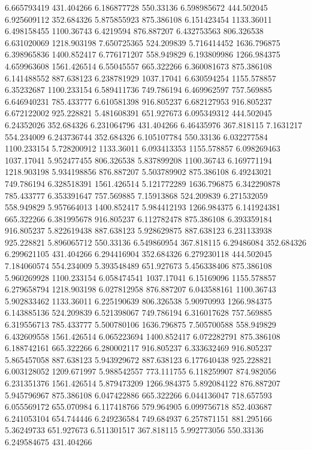6.665793419	431.404266
6.186877728	550.33136
6.598985672	444.502045
6.925609112	352.684326
5.875855923	875.386108
6.151423454	1133.36011
6.498158455	1100.36743
6.4219594	876.887207
6.432753563	806.326538
6.631020069	1218.903198
7.650725365	524.209839
5.716414452	1636.796875
6.398965836	1400.852417
6.776171207	558.949829
6.193809986	1266.984375
4.659963608	1561.426514
6.55045557	665.322266
6.360081673	875.386108
6.141488552	887.638123
6.238781929	1037.17041
6.630594254	1155.578857
6.35232687	1100.233154
6.589411736	749.786194
6.469962597	757.569885
6.646940231	785.433777
6.610581398	916.805237
6.682127953	916.805237
6.672122002	925.228821
5.481608391	651.927673
6.095349312	444.502045
6.24352026	352.684326
6.231064796	431.404266
6.46435976	367.818115
7.1631217	554.234009
6.243736744	352.684326
6.105107784	550.33136
6.032277584	1100.233154
5.728200912	1133.36011
6.093413353	1155.578857
6.098269463	1037.17041
5.952477455	806.326538
5.837899208	1100.36743
6.169771194	1218.903198
5.934198856	876.887207
5.503789902	875.386108
6.49243021	749.786194
6.328518391	1561.426514
5.121772289	1636.796875
6.342290878	785.433777
6.353391647	757.569885
7.15913868	524.209839
6.271532059	558.949829
5.957664013	1400.852417
5.984412193	1266.984375
6.141924381	665.322266
6.381995678	916.805237
6.112782478	875.386108
6.393359184	916.805237
5.822619438	887.638123
5.928629875	887.638123
6.231133938	925.228821
5.896065712	550.33136
6.549860954	367.818115
6.29486084	352.684326
6.299621105	431.404266
6.294416904	352.684326
6.279230118	444.502045
7.184060574	554.234009
5.393548489	651.927673
5.456338406	875.386108
5.960269928	1100.233154
6.058474541	1037.17041
6.15169096	1155.578857
6.279658794	1218.903198
6.027812958	876.887207
6.043588161	1100.36743
5.902833462	1133.36011
6.225190639	806.326538
5.90970993	1266.984375
6.143885136	524.209839
6.521398067	749.786194
6.316017628	757.569885
6.319556713	785.433777
5.500780106	1636.796875
7.505700588	558.949829
6.432609558	1561.426514
6.065223694	1400.852417
6.072282791	875.386108
6.188742161	665.322266
6.280002117	916.805237
6.333632469	916.805237
5.865457058	887.638123
5.943929672	887.638123
6.177640438	925.228821
6.003128052	1209.671997
5.988542557	773.111755
6.118259907	874.982056
6.231351376	1561.426514
5.879473209	1266.984375
5.892084122	876.887207
5.945796967	875.386108
6.047422886	665.322266
6.044136047	718.657593
6.055569172	655.070984
6.117418766	579.964905
6.099756718	852.403687
6.241053104	654.744446
6.249236584	749.684937
6.257871151	881.295166
5.36249733	651.927673
6.511301517	367.818115
5.992773056	550.33136
6.249584675	431.404266

